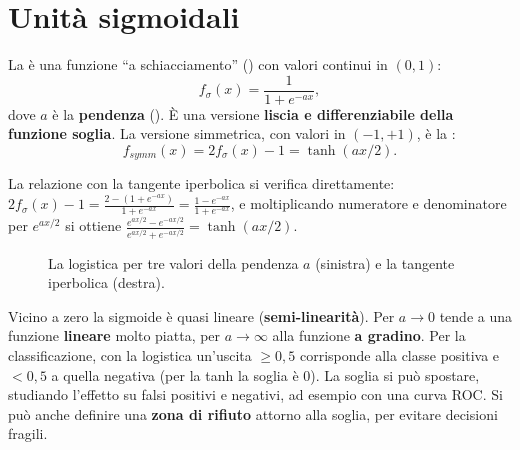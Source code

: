\section{Unità sigmoidali}
\label{sec:sigmoidi}

\begin{definizione}
La  è una funzione ``a schiacciamento'' () con valori continui in
$(0,1)$:
\[
f_\sigma(x) = \frac{1}{1+e^{-ax}} ,
\]
dove $a$ è la \textbf{pendenza} (). È una versione \textbf{liscia e differenziabile della funzione
soglia}. La versione simmetrica, con valori in $(-1,+1)$, è la :
\[
f_{\mathit{symm}}(x) = 2f_\sigma(x) - 1 = \tanh(ax/2).
\]
\end{definizione}

La relazione con la tangente iperbolica si verifica direttamente:
$2f_\sigma(x)-1 = \frac{2-(1+e^{-ax})}{1+e^{-ax}} = \frac{1-e^{-ax}}{1+e^{-ax}}$, e moltiplicando numeratore e
denominatore per $e^{ax/2}$ si ottiene $\frac{e^{ax/2}-e^{-ax/2}}{e^{ax/2}+e^{-ax/2}} = \tanh(ax/2)$.

\begin{figure}[ht]
\centering
{}
\caption{La logistica per tre valori della pendenza $a$ (sinistra) e la tangente iperbolica (destra).}
\label{fig:sigmoidi}
\end{figure}

Vicino a zero la sigmoide è quasi lineare (\textbf{semi-linearità}). Per $a\to0$ tende a una funzione
\textbf{lineare} molto piatta, per $a\to\infty$ alla funzione \textbf{a gradino}. Per la classificazione, con la
logistica un'uscita $\ge0{,}5$ corrisponde alla classe positiva e $<0{,}5$ a quella negativa (per la tanh la
soglia è 0). La soglia si può spostare, studiando l'effetto su falsi positivi e negativi, ad esempio con una curva
ROC. Si può anche definire una \textbf{zona di rifiuto} attorno alla soglia, per evitare decisioni fragili.

